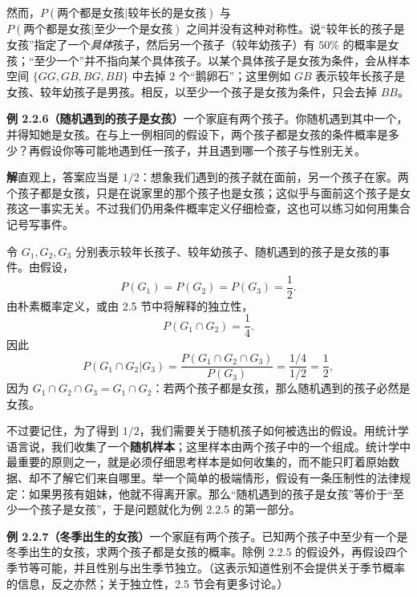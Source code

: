 \documentclass[UTF8,12pt,a4paper,fontset=fandol]{ctexart}
\begin{document}
然而，$P(\text{两个都是女孩}|\text{较年长的是女孩})$ 与 $P(\text{两个都是女孩}|\text{至少一个是女孩})$ 之间并没有这种对称性。说“较年长的孩子是女孩”指定了一个\textit{具体}孩子，然后另一个孩子（较年幼孩子）有 $50\%$ 的概率是女孩；“至少一个”并不指向某个具体孩子。以某个具体孩子是女孩为条件，会从样本空间 $\{GG,GB,BG,BB\}$ 中去掉 $2$ 个“鹅卵石”；这里例如 $GB$ 表示较年长孩子是女孩、较年幼孩子是男孩。相反，以至少一个孩子是女孩为条件，只会去掉 $BB$。

\noindent\textbf{例 2.2.6（随机遇到的孩子是女孩）}\quad 一个家庭有两个孩子。你随机遇到其中一个，并得知她是女孩。在与上一例相同的假设下，两个孩子都是女孩的条件概率是多少？再假设你等可能地遇到任一孩子，并且遇到哪一个孩子与性别无关。

\noindent\textbf{解}\quad 直观上，答案应当是 $1/2$：想象我们遇到的孩子就在面前，另一个孩子在家。两个孩子都是女孩，只是在说家里的那个孩子也是女孩；这似乎与面前这个孩子是女孩这一事实无关。不过我们仍用条件概率定义仔细检查，这也可以练习如何用集合记号写事件。

令 $G_1,G_2,G_3$ 分别表示较年长孩子、较年幼孩子、随机遇到的孩子是女孩的事件。由假设，
\[
  P(G_1)=P(G_2)=P(G_3)=\frac12.
\]
由朴素概率定义，或由 2.5 节中将解释的独立性，
\[
  P(G_1\cap G_2)=\frac14.
\]
因此
\[
  P(G_1\cap G_2|G_3)
  =
  \frac{P(G_1\cap G_2\cap G_3)}{P(G_3)}
  =
  \frac{1/4}{1/2}
  =
  \frac12,
\]
因为 $G_1\cap G_2\cap G_3=G_1\cap G_2$：若两个孩子都是女孩，那么随机遇到的孩子必然是女孩。

不过要记住，为了得到 $1/2$，我们需要关于随机孩子如何被选出的假设。用统计学语言说，我们收集了一个\textbf{随机样本}；这里样本由两个孩子中的一个组成。统计学中最重要的原则之一，就是必须仔细思考样本是如何收集的，而不能只盯着原始数据、却不了解它们来自哪里。举一个简单的极端情形，假设有一条压制性的法律规定：如果男孩有姐妹，他就不得离开家。那么“随机遇到的孩子是女孩”等价于“至少一个孩子是女孩”，于是问题就化为例 2.2.5 的第一部分。

\noindent\textbf{例 2.2.7（冬季出生的女孩）}\quad 一个家庭有两个孩子。已知两个孩子中至少有一个是冬季出生的女孩，求两个孩子都是女孩的概率。除例 2.2.5 的假设外，再假设四个季节等可能，并且性别与出生季节独立。（这表示知道性别不会提供关于季节概率的信息，反之亦然；关于独立性，2.5 节会有更多讨论。）
\end{document}
